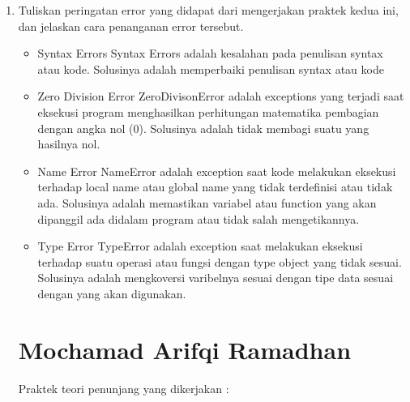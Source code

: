 \begin{enumerate}

\item Tuliskan peringatan error yang didapat dari mengerjakan praktek kedua ini, dan jelaskan cara penanganan error tersebut.
\begin{itemize}

\item Syntax Errors
Syntax Errors adalah kesalahan pada penulisan syntax atau kode. Solusinya adalah memperbaiki penulisan syntax atau kode

\item Zero Division Error
ZeroDivisonError adalah exceptions yang terjadi saat eksekusi program menghasilkan perhitungan matematika pembagian dengan angka nol (0). Solusinya adalah tidak membagi suatu yang hasilnya nol.

\item Name Error
NameError adalah exception saat kode melakukan eksekusi terhadap local name atau global name yang tidak terdefinisi atau tidak ada. Solusinya adalah memastikan variabel atau function yang akan dipanggil ada didalam program atau tidak salah mengetikannya.

\item Type Error
TypeError adalah exception saat melakukan eksekusi terhadap suatu operasi atau fungsi dengan type object yang tidak sesuai. Solusinya adalah mengkoversi varibelnya sesuai dengan tipe data sesuai dengan yang akan digunakan.
   
\end{itemize}


\section{Mochamad Arifqi Ramadhan}
Praktek teori penunjang yang dikerjakan :

\end{enumerate}
